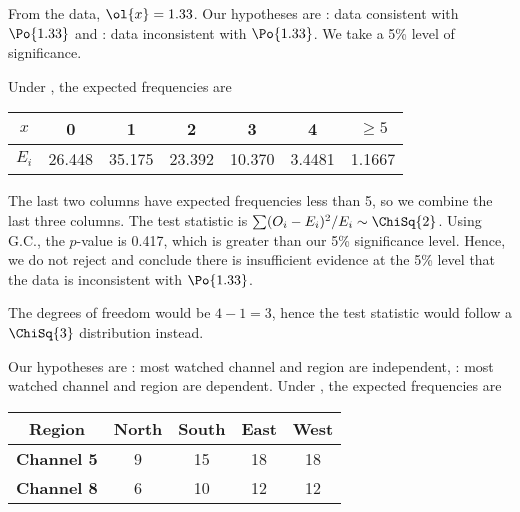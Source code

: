 \begin{solution}
    \begin{ppart}
        \begin{psubpart}
            From the data, $\ol{x} = 1.33$. Our hypotheses are \nullhyp: data consistent with $\Po{1.33}$ and \althyp: data inconsistent with $\Po{1.33}$. We take a 5\% level of significance.

            Under \nullhyp, the expected frequencies are
            \begin{table}[H]
            \centering
            \begin{tabular}{|c|c|c|c|c|c|c|}
                \hline
                $x$ & 0 & 1 & 2 & 3 & 4 & $\geq 5$ \\ \hline
                $E_i$ & 26.448 & 35.175 & 23.392 & 10.370 & 3.4481 & 1.1667 \\ \hline
            \end{tabular}
            \end{table}
            The last two columns have expected frequencies less than 5, so we combine the last three columns. The test statistic is $\sum (O_i - E_i)^2 / E_i \sim \ChiSq{2}$. Using G.C., the $p$-value is 0.417, which is greater than our 5\% significance level. Hence, we do not reject \nullhyp{} and conclude there is insufficient evidence at the 5\% level that the data is inconsistent with $\Po{1.33}$.
        \end{psubpart}
        \begin{psubpart}
            The degrees of freedom would be $4-1 = 3$, hence the test statistic would follow a $\ChiSq{3}$ distribution instead.
        \end{psubpart}
    \end{ppart}
    \begin{ppart}
        Our hypotheses are \nullhyp: most watched channel and region are independent, \althyp: most watched channel and region are dependent. Under \nullhyp, the expected frequencies are
        \begin{table}[H]
            \centering
            \begin{tabular}{|c|c|c|c|c|}
                \hline
                \textbf{Region} & North & South & East & West \\ \hline
                \textbf{Channel 5} & 9 & 15 & 18 & 18 \\ \hline
                \textbf{Channel 8} & 6 & 10 & 12 & 12 \\ \hline
            \end{tabular}

\end{table}
\end{ppart}
\end{solution}
